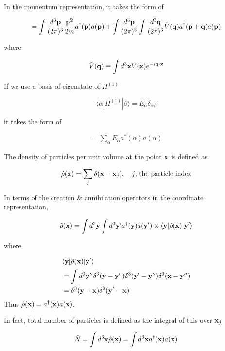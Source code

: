 In the momentum representation, it takes the form of

\begin{align}
=\int\frac{d^3\bf p}{(2\pi)^3} \frac{\bf p^2}{2m}a^\dagger({\bf p})a({\bf p})+\int\frac{d^3\bf p}{(2\pi)^3}\int\frac{d^3\bf q}{(2\pi)^3}\tilde{V}({\bf q})a^\dagger({\bf p+q})a({\bf p})
\end{align}

where 

\[\tilde{V}({\bf q}) \equiv\int d^3{\bf x} V({\bf x})e^{-i\bf q\cdot x} \]

If we use a basis of eigenstate of $H^{(1)}$

\[\langle\alpha|H^{(1)}|\beta\rangle = E_\alpha\delta_{\alpha\beta} \]

it takes the form of

\begin{align}
=\sum_\alpha E_\alpha a^\dagger(\alpha)a(\alpha)
\end{align}

The density of particles per unit volume at the point $\bf x$ is defined as 

\[\hat{\rho}({\bf x}) = \sum_j\delta({\bf x - x}_j),\quad j\text{, the particle index} \]

In terms of the creation \& annihilation operators in the coordinate representation, 

\[\hat{\rho}({\bf x}) = \int d^3{\bf y}\int d^3{\bf y'}a^\dagger({\bf y})a({\bf y'})\times\langle{\bf y}|\hat{\rho}(\bf x)|{\bf y'}\rangle \]

where

\begin{align}
\begin{split}
&\langle {\bf y}|\hat{\rho}({\bf x})|{\bf y'}\rangle\\
&=\int d^3{\bf y''}\delta^3({\bf y - y''})\delta^3({\bf y'-y''})\delta^3(\bf x - y'')\\
&=\delta^3({\bf y - x})\delta^3(\bf y' - x)\\
\end{split}
\end{align}
Thus $\hat{\rho}({\bf x})=a^\dagger({\bf x})a({\bf x})$.

In fact, total number of particles is defined as the integral of this over ${\bf x}_j$

\begin{align}\label{eqs1.7.15}
\hat{N}=\int d^3{\bf x}\hat{\rho}({\bf x}) = \int d^3{\bf x}a^\dagger({\bf x})a(\bf x)
\end{align}

